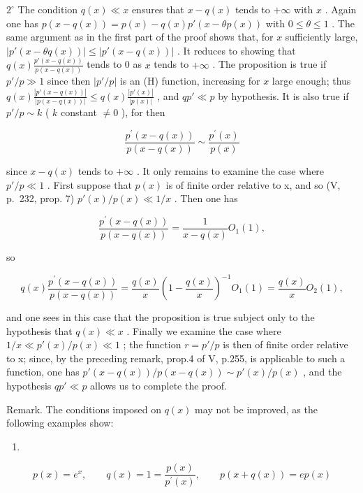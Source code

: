 \(2^{\circ}\) The condition \(q(x) \ll x\) ensures that \(x - q(x)\) tends to \(+\infty\) with \(x\) . Again one has \(p(x - q(x)) = p(x) - q(x)p'(x - \theta p(x))\) with \(0 \leqslant \theta \leqslant 1\) . The same argument as in the first part of the proof shows that, for \(x\) sufficiently large, \(\left|p'(x - \theta q(x))\right| \leqslant \left|p'(x - q(x))\right|\) . It reduces to showing that \(q(x)\frac{p'(x - q(x))}{p(x - q(x))}\) tends to 0 as \(x\) tends to \(+\infty\) . The proposition is true if \(p'/p \gg 1\) since then \(\left|p'/p\right|\) is an (H) function, increasing for \(x\) large enough; thus \(q(x)\frac{\left|p'(x - q(x))\right|}{\left|p(x - q(x))\right|} \leqslant q(x)\frac{\left|p'(x)\right|}{\left|p(x)\right|}\) , and \(qp' \ll p\) by hypothesis. It is also true if \(p'/p \sim k\) ( \(k\) constant \(\neq 0\) ), for then

\[
\frac {p ^ {\prime} (x - q (x))}{p (x - q (x))} \sim \frac {p ^ {\prime} (x)}{p (x)}
\]

since \(x - q(x)\) tends to \(+\infty\) . It only remains to examine the case where \(p' / p \ll 1\) . First suppose that \(p(x)\) is of finite order relative to x, and so (V, p.~232, prop. 7) \(p'(x) / p(x) \ll 1 / x\) . Then one has

\[
\frac {p ^ {\prime} (x - q (x))}{p (x - q (x))} = \frac {1}{x - q (x)} O _ {1} (1),
\]

so

\[
q (x) \frac {p ^ {\prime} (x - q (x))}{p (x - q (x))} = \frac {q (x)}{x} \left(1 - \frac {q (x)}{x}\right) ^ {- 1} O _ {1} (1) = \frac {q (x)}{x} O _ {2} (1),
\]

and one sees in this case that the proposition is true subject only to the hypothesis that \(q(x) \ll x\) . Finally we examine the case where \(1/x \ll p'(x)/p(x) \ll 1\) ; the function \(r = p'/p\) is then of finite order relative to x; since, by the preceding remark, prop.4 of V, p.255, is applicable to such a function, one has \(p'(x-q(x))/p(x-q(x)) \sim p'(x)/p(x)\) , and the hypothesis \(qp' \ll p\) allows us to complete the proof.

Remark. The conditions imposed on \(q(x)\) may not be improved, as the following examples show:

\begin{enumerate}
\def\labelenumi{\alph{enumi})}
\tightlist
\item
\end{enumerate}

\[
p (x) = e ^ {x}, \qquad q (x) = 1 = \frac {p (x)}{p ^ {\prime} (x)}, \qquad p (x + q (x)) = e p (x)
\]

